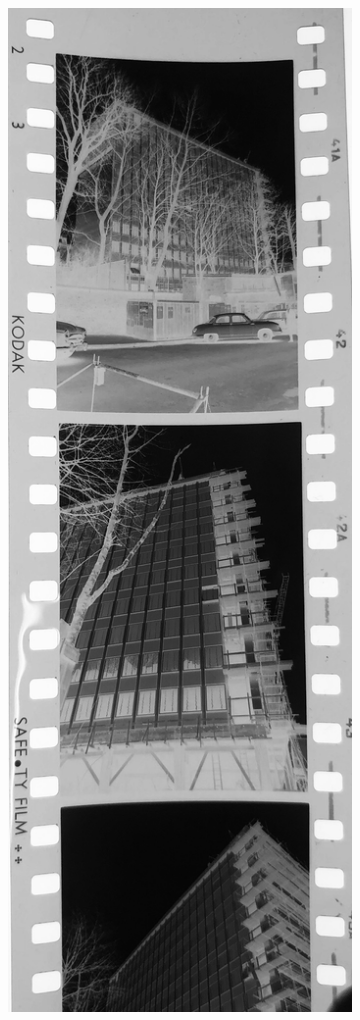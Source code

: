 \begin{figure}[H]
\begin{subfigure}{0.20\textwidth}
        \includegraphics[width=\linewidth]{Illustrations/P5.jpg}

\end{subfigure}
\end{figure}
